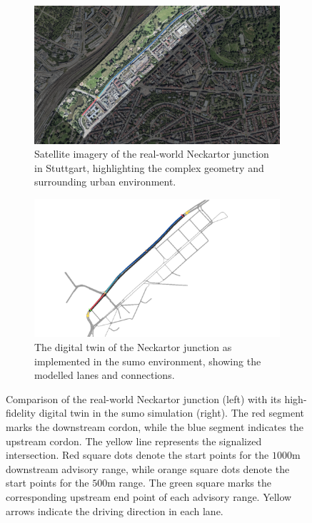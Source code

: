 \begin{figure}[htb]
  \centering
  \begin{subfigure}[b]{0.49\textwidth}
    \includegraphics[width=\linewidth, page=1]{data/img/Neckartor/StuttgartNeckartorReal.pdf}
    \caption[Neckartor junction satellite image]{Satellite imagery of the real-world Neckartor junction in Stuttgart, highlighting the complex geometry and surrounding urban environment.}
    \label{fig:NeckartorMapReal}
  \end{subfigure}
  \hfill
  \begin{subfigure}[b]{0.49\textwidth}
    \includegraphics[width=\linewidth, page=1]{data/img/Neckartor/StuttgartNeckartorSumo.pdf}
    \caption[Digital twin of Neckartor in \ac{sumo}]{The digital twin of the Neckartor junction as implemented in the \ac{sumo} environment, showing the modelled lanes and connections.}
    \label{fig:NeckartorMapSUMO}
  \end{subfigure}
  \caption[Real-World vs. Simulated Neckartor Junction]{%
  Comparison of the real-world Neckartor junction (left) with its high-fidelity digital twin in the \ac{sumo} simulation (right). 
  The red segment marks the downstream cordon, while the blue segment indicates the upstream cordon. 
  The yellow line represents the signalized intersection. 
  Red square dots denote the start points for the $1000\unit{\metre}$ downstream advisory range, while orange square dots denote the start points for the $500\unit{\metre}$ range. 
  The green square marks the corresponding upstream end point of each advisory range. 
  Yellow arrows indicate the driving direction in each lane.}
  \label{fig:NeckartorMapComparison}
\end{figure}

